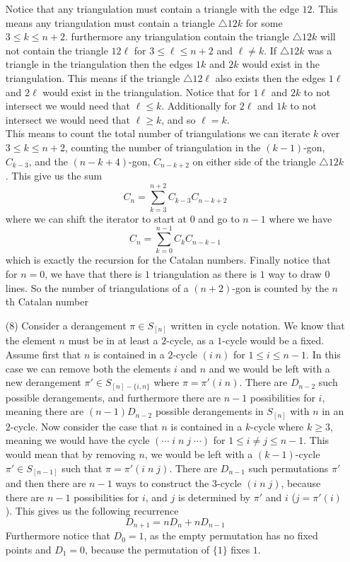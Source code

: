 \documentclass[12pt]{amsart}
\theoremstyle{definition}
\begin{document}
\begin{itemize}
Notice that any triangulation must contain a triangle with the edge $12$. This means any triangulation must contain a triangle $\triangle 12k$ for some $3\leq k\leq n+2$. furthermore any triangulation contain the triangle $\triangle 12k$ will not contain the triangle $12\ell$ for $3\leq \ell\leq n+2$ and $\ell\neq k$. If $\triangle12k$ was a triangle in the triangulation then the edges $1k$ and $2k$ would exist in the triangulation. This means if the triangle $\triangle 12\ell$ also exists then the edges $1\ell$ and $2\ell$ would exist in the triangulation. Notice that for $1\ell$ and $2k$ to not intersect we would need that $\ell\leq k$. Additionally for $2\ell$ and $1k$ to not intersect we would need that $\ell\geq k$, and so $\ell=k$.\\

This means to count the total number of triangulations we can iterate $k$ over $3\leq k\leq n+2$, counting the number of triangulation in the $(k-1)$-gon, $C_{k-3}$, and the $(n-k+4)$-gon, $C_{n-k+2}$ on either side of the triangle $\triangle{12k}$. This give us the sum
$$C_n=\sum_{k=3}^{n+2}C_{k-3}C_{n-k+2}$$
where we can shift the iterator to start at $0$ and go to $n-1$ where we have
$$C_n=\sum_{k=0}^{n-1}C_{k}C_{n-k-1}$$
which is exactly the recursion for the Catalan numbers. Finally notice that for $n=0$, we have that there is $1$ triangulation as there is $1$ way to draw $0$ lines. So the number of triangulations of a $(n+2)$-gon is counted by the $n$th Catalan number\\

\item[(8)] 
Consider a derangement $\pi\in S_{[n]}$ written in cycle notation. We know that the element $n$ must be in at least a $2$-cycle, as a $1$-cycle would be a fixed. Assume first that $n$ is contained in a $2$-cycle $(i\;n)$ for $1\leq i\leq n-1$. In this case we can remove both the elements $i$ and $n$ and we would be left with a new derangement $\pi'\in S_{[n]-\{i,n\}}$ where $\pi=\pi' (i\;n)$. There are $D_{n-2}$ such possible derangements, and furthermore there are $n-1$ possibilities for $i$, meaning there are $(n-1)D_{n-2}$ possible derangements in $S_{[n]}$ with $n$ in an $2$-cycle. Now consider the case that $n$ is contained in a $k$-cycle where $k\geq 3$, meaning we would have the cycle $(\cdots\; i \; n \; j \; \cdots)$ for $1\leq i\neq j \leq n-1$. This would mean that by removing $n$, we would be left with a $(k-1)$-cycle $\pi'\in S_{[n-1]}$ such that $\pi=\pi'(i\;n\;j)$. There are $D_{n-1}$ such permutations $\pi'$ and then there are $n-1$ ways to construct the $3$-cycle $(i\;n\;j)$, because there are $n-1$ possibilities for $i$, and $j$ is determined by $\pi'$ and $i$ ($j=\pi'(i)$). This gives us the following recurrence 
$$D_{n+1}=nD_{n}+nD_{n-1}$$
Furthermore notice that $D_0=1$, as the empty permutation has no fixed points and $D_1=0$, because the permutation of $\{1\}$ fixes $1$.\\


\end{itemize}
\end{document}
